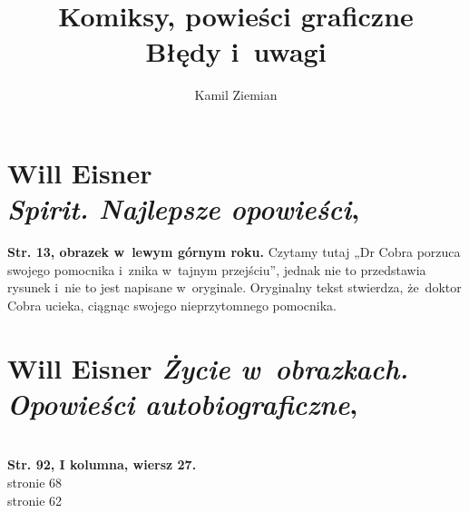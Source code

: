 \documentclass[a4paper,11pt]{article}
\title{Komiksy, powieści graficzne \\
  {\Large Błędy i~uwagi}}
\author{Kamil Ziemian}
\begin{document}





\maketitle %





\section{ %
  Will Eisner \\
  \textit{Spirit. Najlepsze opowieści},
  \parencite{Eisner-Spirit-Najlepsze-opowiesci-Pub-2009}}




\noindent
\textbf{Str. 13, obrazek w~lewym górnym roku.} Czytamy tutaj „Dr Cobra
porzuca swojego pomocnika i~znika w~tajnym przejściu”, jednak nie to
przedstawia rysunek i~nie to jest napisane w~oryginale. Oryginalny tekst
stwierdza, że~doktor Cobra ucieka, ciągnąc swojego nieprzytomnego pomocnika.












\section{Will Eisner \textit{Życie w~obrazkach. Opowieści
    autobiograficzne},
  \cite{EisnerZycieWObrazkach2009}}




\noindent \\
\textbf{Str. 92, I kolumna, wiersz 27.} \\
\Jest stronie 68 \\
\PowinnoByc stronie 62 \\













\printbibliography





\end{document}
